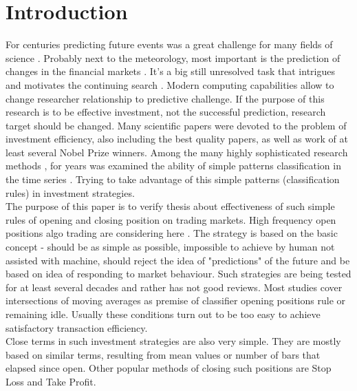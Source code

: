 \documentclass{tewiart}
\begin{document}
\section{Introduction}
\indent For centuries predicting future events was a great challenge for many fields of science \cite{ball07, wu12}. Probably next to the meteorology, most important is the prediction of changes in the financial markets \cite{krutsinger99, satchwell05, schwager02}. It's a big still unresolved task that intrigues and motivates the continuing search \cite{fama91, fama98}. Modern computing capabilities allow to change researcher relationship to predictive challenge. If the purpose of this research is to be effective investment, not the successful prediction, research target should be changed. Many scientific papers were devoted to the problem of investment efficiency, also including the best quality papers, as well as work of at least several Nobel Prize winners. Among the many highly sophisticated research methods \cite{fujimoto03, kompa08, pawlak02, pedrycz97, rua09, raghuraj09, wilinski09} , for years was examined the ability of simple patterns classification in the time series \cite{brock92, cai05, gencay99, lebaron99, satchwell05}. Trying to take advantage of this simple patterns (classification rules) in investment strategies.\\
\indent The purpose of this paper is to verify thesis about effectiveness of such simple rules of opening and closing position on trading markets. High frequency open positions algo trading are considering here \cite{muriel04}. The strategy is based on the basic concept - should be as simple as possible, impossible to achieve by human not assisted with machine, should reject the idea of "predictions" of the future and be based on idea of responding to market behaviour. Such strategies are being tested for at least several decades and rather has not good reviews. Most studies cover intersections of moving averages as premise of classifier opening positions rule or remaining idle. Usually these conditions turn out to be too easy to achieve satisfactory transaction efficiency.\\
\indent Close terms in such investment strategies are also very simple. They are mostly based on similar terms, resulting from mean values or number of bars that elapsed since open. Other popular methods of closing such positions are Stop Loss and Take Profit.
\end{document}
